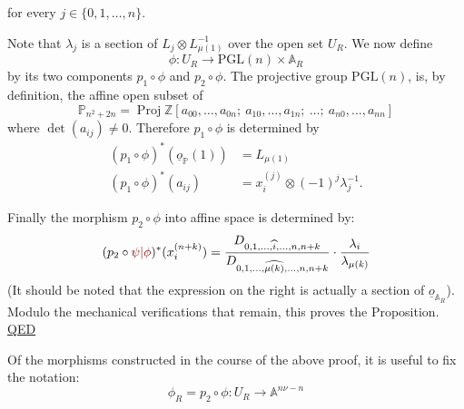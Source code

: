 
for every $j\in\{0,1,\ldots,n\}$.

Note that $\lambda_j$ is a section of $L_j\otimes L_{\mu(1)}^{-1}$ over the open set $U_R$. We now define
\[
\phi:U_R\longrightarrow\mathrm{PGL}(n)\times\mathbb{A}_R
\]
by its two components $p_1\circ\phi$ and $p_2\circ\phi$. The projective group $\mathrm{PGL}(n)$, is, by definition, the affine open subset of
\[
\mathbb{P}_{n^2+2n}=\operatorname{Proj}\mathbb{Z}[a_{00},\ldots,a_{0n};\ a_{10},\ldots,a_{1n};\ \ldots;\ a_{n0},\ldots,a_{nn}]
\]
where $\det(a_{ij})\ne0$. Therefore $p_1\circ\phi$ is determined by
\[
\begin{aligned}
(p_1\circ\phi)^*(\underline{o}_{\mathbb{P}}(1))&=L_{\mu(1)}\\
(p_1\circ\phi)^*(a_{ij})&=x_i^{(j)}\otimes(-1)^j\lambda_j^{-1}.
\end{aligned}
\]

Finally the morphism $p_2\circ\phi$ into affine space is determined by:
\[
(p_2\circ\unsure{\psi|\phi})^*(x_i^{(n+k)})
=\frac{D_{0,1,\ldots,\widehat{i},\ldots,n,n+k}}{D_{0,1,\ldots,\widehat{\mu(k)},\ldots,n,n+k}}
\cdot\frac{\lambda_i}{\lambda_{\mu(k)}}
\]
(It should be noted that the expression on the right is actually a section of $\underline{o}_{\mathbb{A}_R}$). Modulo the mechanical verifications that remain, this proves the Proposition. \uline{QED}

Of the morphisms constructed in the course of the above proof, it is useful to  fix the notation:
\[
\phi_R=p_2\circ\phi:U_R\longrightarrow\mathbb{A}^{n\nu-n}
\]
